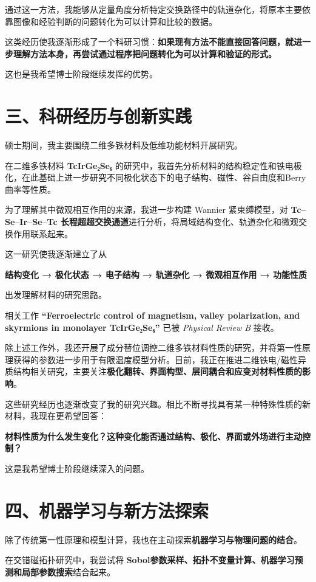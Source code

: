 通过这一方法，我能够从定量角度分析特定交换路径中的轨道杂化，将原本主要依靠图像和经验判断的问题转化为可以计算和比较的数据。

这类经历使我逐渐形成了一个科研习惯：\textbf{如果现有方法不能直接回答问题，就进一步理解方法本身，再尝试通过程序把问题转化为可以计算和验证的形式。}

这也是我希望博士阶段继续发挥的优势。

\section{三、科研经历与创新实践}

硕士期间，我主要围绕二维多铁材料及低维功能材料开展研究。

在二维多铁材料 \textbf{TcIrGe₂Se₆} 的研究中，我首先分析材料的结构稳定性和铁电极化，在此基础上进一步研究不同极化状态下的电子结构、磁性、谷自由度和Berry曲率等性质。

为了理解其中微观相互作用的来源，我进一步构建 Wannier 紧束缚模型，对 \textbf{Tc–Se–Ir–Se–Tc 长程超超交换通道}进行分析，将局域结构变化、轨道杂化和微观交换作用联系起来。

这一研究使我逐渐建立了从

\textbf{结构变化 → 极化状态 → 电子结构 → 轨道杂化 → 微观相互作用 → 功能性质}

出发理解材料的研究思路。

相关工作 \textbf{“Ferroelectric control of magnetism, valley polarization, and skyrmions in monolayer TcIrGe₂Se₆”} 已被 \textit{Physical Review B} 接收。

除上述工作外，我还开展了成分替位调控二维多铁材料性质的研究，并将第一性原理获得的参数进一步用于有限温度模型分析。目前，我正在推进二维铁电/磁性异质结构相关研究，主要关注\textbf{极化翻转、界面构型、层间耦合和应变对材料性质的影响}。

这些研究经历也逐渐改变了我的研究兴趣。相比不断寻找具有某一种特殊性质的新材料，我现在更希望回答：

\textbf{材料性质为什么发生变化？这种变化能否通过结构、极化、界面或外场进行主动控制？}

这是我希望博士阶段继续深入的问题。

\section{四、机器学习与新方法探索}

除了传统第一性原理和模型计算，我也在主动探索\textbf{机器学习与物理问题的结合}。

在交错磁拓扑研究中，我尝试将 \textbf{Sobol参数采样、拓扑不变量计算、机器学习预测和局部参数搜索}结合起来。

